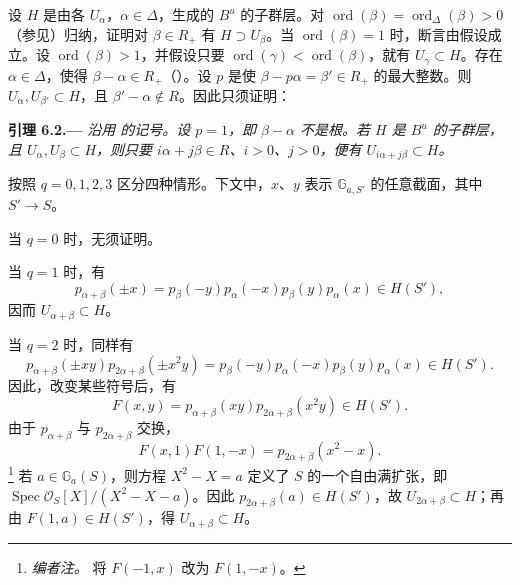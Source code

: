 设 \(H\) 是由各 \(U_\alpha\)，\(\alpha\in\Delta\)，生成的 \(B^u\) 的子群层。对 \(\operatorname{ord}(\beta)=\operatorname{ord}_\Delta(\beta)>0\)（参见）归纳，证明对 \(\beta\in R_+\) 有 \(H\supset U_\beta\)。当 \(\operatorname{ord}(\beta)=1\) 时，断言由假设成立。设 \(\operatorname{ord}(\beta)>1\)，并假设只要 \(\operatorname{ord}(\gamma)<\operatorname{ord}(\beta)\)，就有 \(U_\gamma\subset H\)。存在 \(\alpha\in\Delta\)，使得 \(\beta-\alpha\in R_+\)（）。设 \(p\) 是使 \(\beta-p\alpha=\beta'\in R_+\) 的最大整数。则 \(U_\alpha,U_{\beta'}\subset H\)，且 \(\beta'-\alpha\notin R\)。因此只须证明：

\par\medskip\noindent{}\textbf{引理 6.2.---}\enspace
\emph{沿用 的记号。设 \(p=1\)，即 \(\beta-\alpha\) 不是根。若 \(H\) 是 \(B^u\) 的子群层，且 \(U_\alpha,U_\beta\subset H\)，则只要 \(i\alpha+j\beta\in R\)、\(i>0\)、\(j>0\)，便有 \(U_{i\alpha+j\beta}\subset H\)。}

按照 \(q=0,1,2,3\) 区分四种情形。下文中，\(x\)、\(y\) 表示 \(\mathbb G_{a,S'}\) 的任意截面，其中 \(S'\to S\)。

当 \(q=0\) 时，无须证明。

当 \(q=1\) 时，有
\[
 p_{\alpha+\beta}(\pm x)
 =p_\beta(-y)p_\alpha(-x)p_\beta(y)p_\alpha(x)\in H(S'),
\]
因而 \(U_{\alpha+\beta}\subset H\)。

当 \(q=2\) 时，同样有
\[
 p_{\alpha+\beta}(\pm xy)
 p_{2\alpha+\beta}(\pm x^2y)
 =p_\beta(-y)p_\alpha(-x)p_\beta(y)p_\alpha(x)\in H(S').
\]
因此，改变某些符号后，有
\[
 F(x,y)=p_{\alpha+\beta}(xy)p_{2\alpha+\beta}(x^2y)\in H(S').
\]
由于 \(p_{\alpha+\beta}\) 与 \(p_{2\alpha+\beta}\) 交换，
\[
 F(x,1)F(1,-x)=p_{2\alpha+\beta}(x^2-x).
\]
\setcounter{footnote}{27}
\footnote{\textit{编者注。} 将 \(F(-1,x)\) 改为 \(F(1,-x)\)。}
若 \(a\in\mathbb G_a(S)\)，则方程 \(X^2-X=a\) 定义了 \(S\) 的一个自由满扩张，即 \(\operatorname{Spec}\mathcal O_S[X]/(X^2-X-a)\)。因此 \(p_{2\alpha+\beta}(a)\in H(S')\)，故 \(U_{2\alpha+\beta}\subset H\)；再由 \(F(1,a)\in H(S')\)，得 \(U_{\alpha+\beta}\subset H\)。

